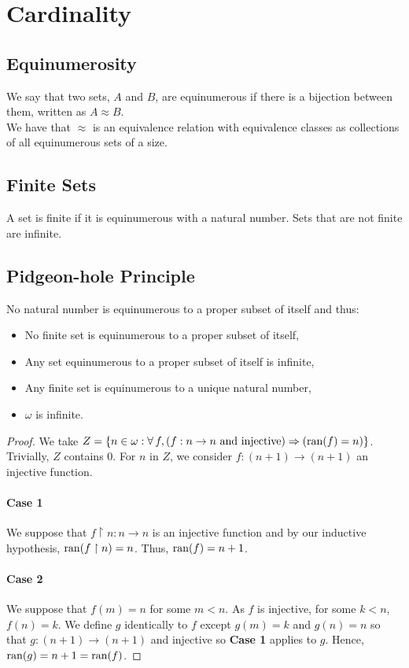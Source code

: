 \section{Cardinality}

\subsection{Equinumerosity}

We say that two sets, $A$ and $B$, are equinumerous if there is a bijection 
between them, written as $A \approx B$.
\\[\baselineskip]
We have that $\approx$ is an equivalence relation with equivalence classes
as collections of all equinumerous sets of a size.

\subsection{Finite Sets}

A set is finite if it is equinumerous with a natural number. Sets that are
not finite are infinite.

\subsection{Pidgeon-hole Principle}

No natural number is equinumerous to a proper subset of itself and thus: 
\begin{itemize}
    \item No finite set is equinumerous to a proper subset of itself,
    \item Any set equinumerous to a proper subset of itself is infinite,
    \item Any finite set is equinumerous to a unique natural number,
    \item $\omega$ is infinite.
\end{itemize}

\begin{proof}
    We take $Z = \{n \in \omega : \forall \, f, 
    (f : n \to n \text{ and injective}) \Rightarrow (\operatorname{ran}(f) = n)\}$. Trivially,
    $Z$ contains $0$. For $n$ in $Z$, we consider $f : (n + 1) \to (n + 1)$
    an injective function.

    \paragraph{Case 1} We suppose that $f \upharpoonright n : n \to n$
    is an injective function and by our inductive hypothesis,
    $\operatorname{ran}(f \upharpoonright n) = n$. Thus, $\operatorname{ran}(f) = n + 1$.

    \paragraph{Case 2} We suppose that $f(m) = n$ for some $m < n$.
    As $f$ is injective, for some $k < n$, $f(n) = k$. We
    define $g$ identically to $f$ except $g(m) = k$ and $g(n) = n$
    so that $g : (n + 1) \to (n + 1)$ and injective so \textbf{Case 1}
    applies to $g$. Hence, \linebreak $\operatorname{ran}(g) = n + 1 = \operatorname{ran}(f)$.
\end{proof}

